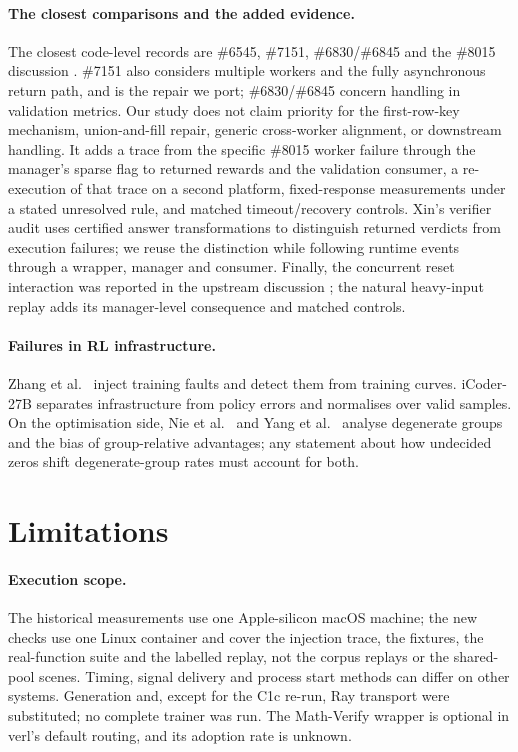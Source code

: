\documentclass[11pt,a4paper]{article}
\newcommand{\pr}[1]{\#{#1}}
\begin{document}
\paragraph{The closest comparisons and the added evidence.} The closest code-level records are \pr{6545}, \pr{7151}, \pr{6830}/\pr{6845} and the \pr{8015} discussion \cite{verl6545,verl7151,verl6830,verl6845,verl8015discussion}. \pr{7151} also considers multiple workers and the fully asynchronous return path, and is the repair we port; \pr{6830}/\pr{6845} concern  handling in validation metrics. Our study does not claim priority for the first-row-key mechanism, union-and-fill repair, generic cross-worker alignment, or downstream  handling. It adds a trace from the specific \pr{8015} worker failure through the manager's sparse flag to returned rewards and the validation consumer, a re-execution of that trace on a second platform, fixed-response measurements under a stated unresolved rule, and matched timeout/recovery controls. Xin's verifier audit \cite{xinaudit} uses certified answer transformations to distinguish returned verdicts from execution failures; we reuse the distinction while following runtime events through a wrapper, manager and consumer. Finally, the concurrent reset interaction was reported in the upstream discussion \cite{verl8015discussion}; the natural heavy-input replay adds its manager-level consequence and matched controls.

\paragraph{Failures in RL infrastructure.} Zhang et al.\ \cite{zhangfault} inject training faults and detect them from training curves. iCoder-27B \cite{icoder} separates infrastructure from policy errors and normalises over valid samples. On the optimisation side, Nie et al.\ \cite{nie} and Yang et al.\ \cite{yang} analyse degenerate groups and the bias of group-relative advantages; any statement about how undecided zeros shift degenerate-group rates must account for both.

\section{Limitations}
\paragraph{Execution scope.} The historical measurements use one Apple-silicon macOS machine; the new checks use one Linux container and cover the injection trace, the fixtures, the real-function suite and the labelled replay, not the corpus replays or the shared-pool scenes. Timing, signal delivery and process start methods can differ on other systems. Generation and, except for the C1c re-run, Ray transport were substituted; no complete trainer was run. The Math-Verify wrapper is optional in verl's default routing, and its adoption rate is unknown.
\end{document}
